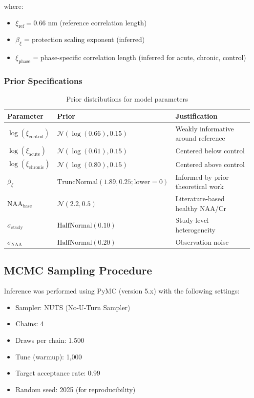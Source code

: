 \documentclass[11pt]{article}
\begin{document}
where:
\begin{itemize}
    \item $\xi_\text{ref} = 0.66$ nm (reference correlation length)
    \item $\beta_\xi$ = protection scaling exponent (inferred)
    \item $\xi_\text{phase}$ = phase-specific correlation length (inferred for acute, chronic, control)
\end{itemize}

\subsubsection{Prior Specifications}

\begin{table}[htbp]
\centering
\caption{Prior distributions for model parameters}
\begin{tabular}{lll}
\toprule
\textbf{Parameter} & \textbf{Prior} & \textbf{Justification} \\
\midrule
$\log(\xi_\text{control})$ & $\mathcal{N}(\log(0.66), 0.15)$ & Weakly informative around reference \\
$\log(\xi_\text{acute})$ & $\mathcal{N}(\log(0.61), 0.15)$ & Centered below control \\
$\log(\xi_\text{chronic})$ & $\mathcal{N}(\log(0.80), 0.15)$ & Centered above control \\
$\beta_\xi$ & $\text{TruncNormal}(1.89, 0.25; \text{lower}=0)$ & Informed by prior theoretical work \\
$\text{NAA}_\text{base}$ & $\mathcal{N}(2.2, 0.5)$ & Literature-based healthy NAA/Cr \\
$\sigma_\text{study}$ & $\text{HalfNormal}(0.10)$ & Study-level heterogeneity \\
$\sigma_\text{NAA}$ & $\text{HalfNormal}(0.20)$ & Observation noise \\
\bottomrule
\end{tabular}
\end{table}

\subsection{MCMC Sampling Procedure}

Inference was performed using PyMC (version 5.x) with the following settings:
\begin{itemize}
    \item Sampler: NUTS (No-U-Turn Sampler)
    \item Chains: 4
    \item Draws per chain: 1,500
    \item Tune (warmup): 1,000
    \item Target acceptance rate: 0.99
    \item Random seed: 2025 (for reproducibility)
\end{itemize}
\end{document}
